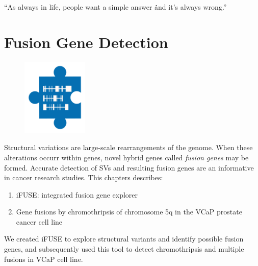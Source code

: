 \begin{savequote}[75mm]
“As always in life, people want a simple answer \. \. \. and it’s always wrong.”
\end{savequote}

\chapter{Fusion Gene Detection}\label{chapter:fusiongenes}
\setcounter{figure}{-1}
\setcounter{table}{-1}
\setcounter{section}{-1}

\begin{figure}[t!]
\includegraphics[height=10em]{frontmatter/images/chapter-header-fusion.png}
\end{figure}
\setcounter{figure}{-1}
\setcounter{table}{-1}
\setcounter{section}{-1}

Structural variations are large-scale rearrangements of the genome. When these alterations occurr within genes, novel hybrid genes called \emph{fusion genes} may be formed. Accurate detection of SVs and resulting fusion genes are an informative in cancer research studies. This chapters describes:

\begin{enumerate}
\itemsep-0.5em
\item iFUSE: integrated fusion gene explorer
\item Gene fusions by chromothripsis of chromosome 5q in the VCaP prostate cancer cell line
\end{enumerate}

We created iFUSE to explore structural variants and identify possible fusion genes, and subsequently used this tool to detect chromothripsis and multiple fusions in VCaP cell line.


